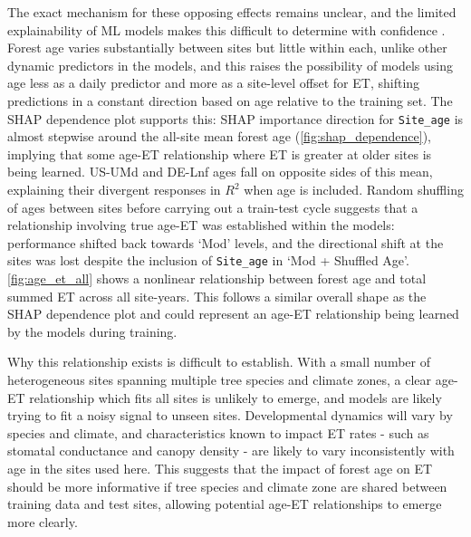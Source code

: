 \par The exact mechanism for these opposing effects remains unclear, and the limited explainability of ML models makes this difficult to determine with confidence  \parencite{hassija2024interpreting}. Forest age varies substantially between sites but little within each, unlike other dynamic predictors in the models, and this raises the possibility of models using age less as a daily predictor and more as a site-level offset for ET, shifting predictions in a constant direction based on age relative to the training set. The SHAP dependence plot supports this: SHAP importance direction for \texttt{Site\_age} is almost stepwise around the all-site mean forest age (\autoref{fig:shap_dependence}), implying that some age-ET relationship where ET is greater at older sites is being learned. US-UMd and DE-Lnf ages fall on opposite sides of this mean, explaining their divergent responses in $R^2$ when age is included. Random shuffling of ages between sites before carrying out a train-test cycle suggests that a relationship involving true age-ET was established within the models: performance shifted back towards `Mod' levels, and the directional shift at the sites was lost despite the inclusion of  \texttt{Site\_age} in `Mod + Shuffled Age'.\autoref{fig:age_et_all} shows a nonlinear relationship between forest age and total summed ET across all site-years. This follows a similar overall shape as the SHAP dependence plot and could represent an age-ET relationship being learned by the models during training.
\par Why this relationship exists is difficult to establish. With a small number of heterogeneous sites spanning multiple tree species and climate zones, a clear age-ET relationship which fits all sites is unlikely to emerge, and models are likely trying to fit a noisy signal to unseen sites. Developmental dynamics will vary by species and climate, and characteristics known to impact ET rates - such as stomatal conductance \parencite{monteith1965evaporation, schafer2000effect} and canopy density \parencite{kool2014review} - are likely to vary inconsistently with age in the sites used here. This suggests that the impact of forest age on ET should be more informative if tree species and climate zone are shared between training data and test sites, allowing potential age-ET relationships to emerge more clearly. 
